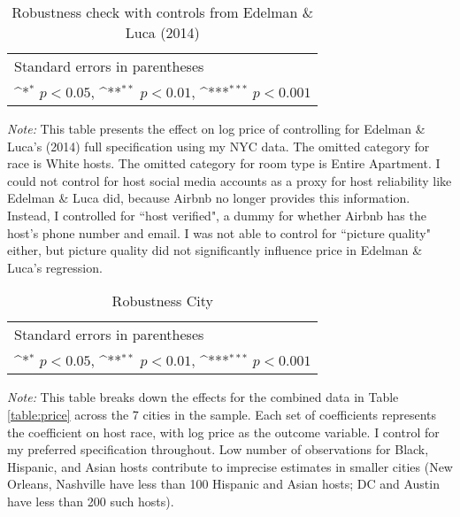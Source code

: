 \begin{table}[htbp]\centering
	\def\sym#1{\ifmmode^{#1}\else\(^{#1}\)\fi}
	
	\caption{Robustness check with controls from Edelman \& Luca (2014)}
	\begin{tabular}{l*{1}{c}}
		\hline\hline
		 
		\hline\hline
		\multicolumn{2}{l}{\footnotesize Standard errors in parentheses}\\
		\multicolumn{2}{l}{\footnotesize \sym{*} \(p<0.05\), \sym{**} \(p<0.01\), \sym{***} \(p<0.001\)}\\
	\end{tabular}
\label{table:edelman_new}
	\begin{tablenotes}
		\item {\it Note:} This table presents the effect on log price of controlling for Edelman \& Luca's (2014) full specification using my NYC data. The omitted category for race is White hosts. The omitted category for room type is Entire Apartment. I could not control for host social media accounts as a proxy for host reliability like Edelman \& Luca did, because Airbnb no longer provides this information. Instead, I controlled for ``host verified", a dummy for whether Airbnb has the host's phone number and email. I was not able to control for ``picture quality" either, but picture quality did not significantly influence price in Edelman \& Luca's regression.
	\end{tablenotes}
\end{table}


\begin{table}[htbp]\centering
	\def\sym#1{\ifmmode^{#1}\else\(^{#1}\)\fi}
	\caption{Robustness City}
	\begin{tabular}{l*{7}{c}}
		\hline\hline
		
		\hline\hline
		\multicolumn{8}{l}{\footnotesize Standard errors in parentheses}\\
		\multicolumn{8}{l}{\footnotesize \sym{*} \(p<0.05\), \sym{**} \(p<0.01\), \sym{***} \(p<0.001\)}\\
	\end{tabular}
\label{table:robustcity}

	\begin{tablenotes}
		\item {\it Note:} This table breaks down the effects for the combined data in Table \ref{table:price} across the 7 cities in the sample. Each set of coefficients represents the coefficient on host race, with log price as the outcome variable. I control for my preferred specification throughout. Low number of observations for Black, Hispanic, and Asian hosts contribute to imprecise estimates in smaller cities (New Orleans, Nashville have less than 100 Hispanic and Asian hosts; DC and Austin have less than 200 such hosts). 
	\end{tablenotes}
\end{table}


